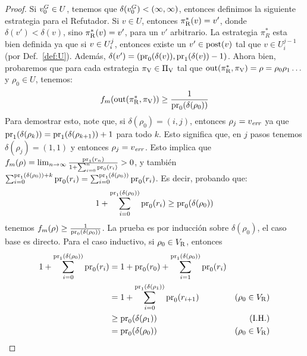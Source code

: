 \begin{proof}
	Si $v_0^G \in U$, tenemos que $\delta(v_0^G) < (\infty, \infty)$, entonces definimos la siguiente estrategia para el Refutador. 
	Si $v \in U$, entonces $\pi^*_{\mathrm{R}}(v)= v'$, donde $\delta(v') < \delta(v)$, sino $\pi^*_{\mathrm{R}}(v)=v'$, para un $v'$ arbitrario. 
	La estrategia $\pi^*_R$ esta bien definida ya que si $v \in U^j_i$, entonces existe un $v' \in \operatorname{post}(v)$ tal que $v \in U^{j-1}_i$ (por Def.~\ref{def:U}). Además, $\delta(v') = (\operatorname{pr}_{0}(\delta(v)), \operatorname{pr}_{1}(\delta(v)) - 1)$.  
	Ahora bien, probaremos que para cada estrategia $\pi_{\mathrm{V}} \in \Pi_{\mathrm{V}}$ tal que $\operatorname{out}(\pi^*_{\mathrm{R}}, \pi_{\mathrm{V}}) = \rho = \rho_0 \rho_1 \dots$ y $\rho_0 \in U$, tenemos:
\begin{equation}\label{eq:inf-bound}
	f_{m}(\operatorname{out}(\pi^*_{\mathrm{R}}, \pi_{\mathrm{V}})) \geq \frac{1}{ \operatorname{pr}_{0}(\delta(\rho_0))}
\end{equation} 
		Para demostrar esto, note que, si $\delta(\rho_0)= (i,j)$, entonces $\rho_j =v_{\mathit{err}}$ 
		ya que $\operatorname{pr}_{1}(\delta(\rho_k)) = \operatorname{pr}_{1}(\delta(\rho_{k+1}))+1$ para todo $k$. 
Esto significa que, en $j$ pasos tenemos $\delta(\rho_{j}) = (1,1)$ y entonces $\rho_{j} = v_{\mathit{err}}$.
	Esto implica que $f_{m}(\rho) =  \lim_{n \rightarrow \infty}  \frac{\operatorname{pr}_{1}(r_n)}{1+ \sum^{n}_{i=0} \operatorname{pr}_{0}(r_i)} >0$, y también
$ \sum^{\operatorname{pr}_{1}(\delta(\rho_0)) + k}_{i=0} \operatorname{pr}_{0}(r_i) =  \sum^{\operatorname{pr}_{1}(\delta(\rho_0))}_{i=0} \operatorname{pr}_{0}(r_i)$.
	 Es decir, probando que:
\begin{equation}\label{eq:bottom-sum}
 1+ \sum^{\operatorname{pr}_{1}(\delta(\rho_0))}_{i=0} \operatorname{pr}_{0}(r_i) \geq \operatorname{pr}_{0}(\delta(\rho_0))
\end{equation} 
tenemos $f_{m}(\rho) \geq \frac{1}{ \operatorname{pr}_{0}(\delta(\rho_0))}$. La prueba es por inducción sobre $\delta(\rho_0)$, el caso base es directo.
 Para el caso inductivo, si $\rho_0 \in V_{\mathrm{R}}$, entonces
\begin{align*}
 	1 + \sum^{\pr{1}{\delta(\rho_0)}}_{i=0} \pr{0}{r_i} & =  1 + \pr{0}{r_0} + \sum^{\pr{1}{\delta(\rho_0)}}_{i=1} \pr{0}{r_i} & \\
					     & =   1+ \sum^{\pr{1}{\delta(\rho_1)}}_{i=0} \pr{0}{r_{i+1}} &  \text{($\rho_0 \in V_\Refuter$)}\\
					     & \geq \pr{0}{\delta(\rho_1)} & \text{(I.H.)} \\
					     & = \pr{0}{\delta(\rho_0)} & \text{($\rho_0 \in V_\Refuter$)}

\end{align*}
\end{proof}
